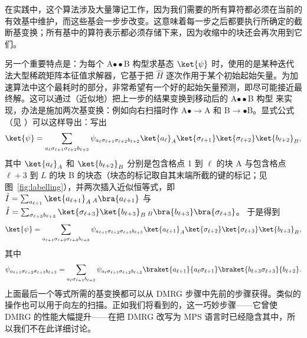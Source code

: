 在实践中，这个算法涉及大量簿记工作，因为我们需要的所有算符都必须在当前的有效基中维护，而这些基会一步步改变。这意味着每一步之后都要执行所确定的截断基变换；所有基中的算符表示都必须存储下来，因为收缩中的块还会再次用到它们。

另一个重要特点是：为每个 A$\bullet\bullet$B 构型求基态 $\ket{\psi}$ 时，使用的是某种迭代法大型稀疏矩阵本征值求解器，它基于把 $\hat{H}$ 逐次作用于某个初始起始矢量。为加速算法中这个最耗时的部分，非常希望有一个好的起始矢量预测，即尽可能接近最终解。这可以通过（近似地）把上一步的结果变换到移动后的 A$\bullet\bullet$B 构型 \cite{White96} 来实现，办法是施加两次基变换：例如向右扫描时作 A$\bullet\rightarrow$A 和 B$\rightarrow\bullet$B。显式公式（见 \cite{Schollwoeck05,White96}）可以这样导出：写出
\begin{equation}
\ket{\psi} = \sum_{a_\ell\sigma_{\ell+1}\sigma_{\ell+2}b_{\ell+2}} \psi_{a_\ell\sigma_{\ell+1}\sigma_{\ell+2}b_{\ell+2}} \ket{a_\ell}_A \ket{\sigma_{\ell+1}} \ket{\sigma_{\ell+2}} \ket{b_{\ell+2}}_B,
\end{equation}
其中 $\ket{a_\ell}_A$ 和 $\ket{b_{\ell+2}}_B$ 分别是包含格点 1 到 $\ell$ 的块 A 与包含格点 $\ell+3$ 到 $L$ 的块 B 的块态（块态的标记取自其末端所截的键的标记；见 图~\ref{fig:labelling}），并两次插入近似恒等式，即 $\hat{I} = \sum_{a_{\ell+1}} \ket{a_{\ell+1}}_A {\,}_A\bra{a_{\ell+1}}$ 与
$\hat{I} = \sum_{\sigma_{\ell+3} b_{\ell+3}} \ket{\sigma_{\ell+3}}\ket{b_{\ell+3}}_B {\, }_B \bra{b_{\ell+3}} \bra{\sigma_{\ell+3}}$。
于是得到
\begin{equation}
\ket{\psi} = \sum_{a_{\ell+1}\sigma_{\ell+2}\sigma_{\ell+3}b_{\ell+3}} \psi_{a_{\ell+1}\sigma_{\ell+2}\sigma_{\ell+3}b_{\ell+3}} \ket{a_{\ell+1}}_A \ket{\sigma_{\ell+2}} \ket{\sigma_{\ell+3}} \ket{b_{\ell+3}}_B,
\end{equation}
其中
\begin{equation}
\psi_{a_{\ell+1}\sigma_{\ell+2}\sigma_{\ell+3}b_{\ell+3}} =
\sum_{a_\ell \sigma_{\ell+1} b_{\ell+2}}
\psi_{a_\ell\sigma_{\ell+1}\sigma_{\ell+2}b_{\ell+2}}
\braket{a_{\ell+1}}{a_\ell \sigma_{\ell+1}} \braket{b_{\ell+3}\sigma_{\ell+3}}{b_{\ell+2}} .
\end{equation}
上面最后一个等式所需的基变换都可以从 DMRG 步骤中先前的步骤获得。类似的操作也可以用于向左的扫描。正如我们将看到的，这一巧妙步骤——它曾使 DMRG 的性能大幅提升——在把 DMRG 改写为 MPS 语言时已经隐含其中，所以我们不在此详细讨论。
